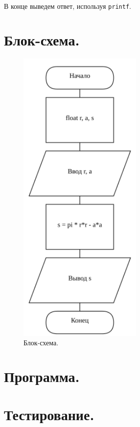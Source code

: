 В конце выведем ответ, используя \texttt{printf}.

\section{Блок-схема.}

\begin{figure}[h] %
    \centering %
    \includegraphics[height=15cm]{scheme} 
    \caption{Блок-схема.} %
    \label{fig:scheme} %
\end{figure}


\section{Программа.}




\section{Тестирование.}

